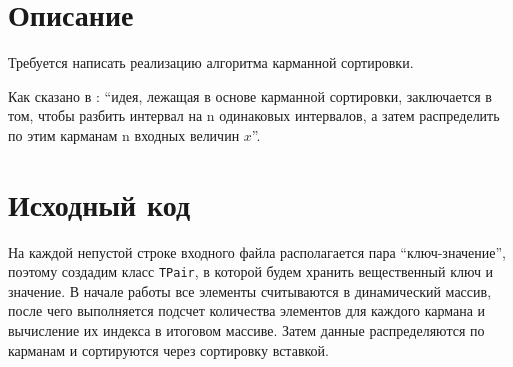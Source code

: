 \documentclass[unicode, 12pt, a4paper,oneside,fleqn]{article}
\begin{document}
\section{Описание}
Требуется написать реализацию алгоритма карманной сортировки.

Как сказано в \cite{Kormen}: \enquote{идея, лежащая в основе карманной сортировки, заключается в том, чтобы разбить интервал на n одинаковых интервалов, а затем
распределить по этим карманам n входных величин $x$}.

\pagebreak

\section{Исходный код}
На каждой непустой строке входного файла располагается пара \enquote{ключ-значение}, поэтому создадим  
класс \texttt{TPair}, в которой будем хранить вещественный ключ и значение. В начале работы все элементы 
считываются в динамический массив, после чего выполняется подсчет количества элементов для каждого кармана 
и вычисление их индекса в итоговом массиве. Затем данные распределяются по карманам и сортируются через сортировку вставкой.
\end{document}
